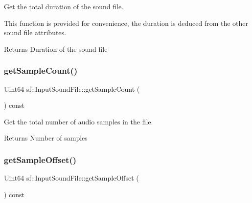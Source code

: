 Get the total duration of the sound file. 

This function is provided for convenience, the duration is deduced from the other sound file attributes.

\begin{DoxyReturn}{Returns}
Duration of the sound file \begin{DoxyVerb}\end{DoxyVerb}
 
\end{DoxyReturn}
\mbox{\label{classsf_1_1_input_sound_file_a665b7fed6cdca3e0c622909e5a6655e4}} 
\subsubsection{\texorpdfstring{getSampleCount()}{getSampleCount()}}
{\footnotesize\ttfamily Uint64 sf\+::\+Input\+Sound\+File\+::get\+Sample\+Count (\begin{DoxyParamCaption}{ }\end{DoxyParamCaption}) const}



Get the total number of audio samples in the file. 

\begin{DoxyReturn}{Returns}
Number of samples \begin{DoxyVerb}\end{DoxyVerb}
 
\end{DoxyReturn}
\mbox{\label{classsf_1_1_input_sound_file_a73a99f159e8aca6e39478f6cf686d7ad}} 
\subsubsection{\texorpdfstring{getSampleOffset()}{getSampleOffset()}}
{\footnotesize\ttfamily Uint64 sf\+::\+Input\+Sound\+File\+::get\+Sample\+Offset (\begin{DoxyParamCaption}{ }\end{DoxyParamCaption}) const}



